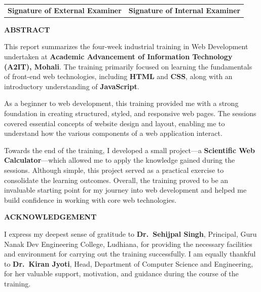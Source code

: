 \documentclass[a4paper,12pt,oneside]{report}
\numberwithin{equation}{chapter}
\numberwithin{figure}{chapter}
\numberwithin{table}{chapter}
\begin{document}
\noindent
\begin{tabular}{p{}p{}}
\centering\textbf{Signature of External Examiner} & \centering\textbf{Signature of Internal Examiner} \\
\end{tabular}

\newpage
\begin{center}
    \large\textbf{ABSTRACT}
\end{center}

This report summarizes the four-week industrial training in Web Development undertaken at \textbf{Academic Advancement of Information Technology (A2IT), Mohali}. The training primarily focused on learning the fundamentals of front-end web technologies, including \textbf{HTML} and \textbf{CSS}, along with an introductory understanding of \textbf{JavaScript}. 

As a beginner to web development, this training provided me with a strong foundation in creating structured, styled, and responsive web pages. The sessions covered essential concepts of website design and layout, enabling me to understand how the various components of a web application interact. 

Towards the end of the training, I developed a small project—a \textbf{Scientific Web Calculator}—which allowed me to apply the knowledge gained during the sessions. Although simple, this project served as a practical exercise to consolidate the learning outcomes. Overall, the training proved to be an invaluable starting point for my journey into web development and helped me build confidence in working with core web technologies.


\newpage
\begin{center}
    \large\textbf{ACKNOWLEDGEMENT}
\end{center}

I express my deepest sense of gratitude to \textbf{Dr.~Sehijpal Singh}, Principal, Guru Nanak Dev Engineering College, Ludhiana, for providing the necessary facilities and environment for carrying out the training successfully. I am equally thankful to \textbf{Dr.~Kiran Jyoti}, Head, Department of Computer Science and Engineering, for her valuable support, motivation, and guidance during the course of the training.
\end{document}
